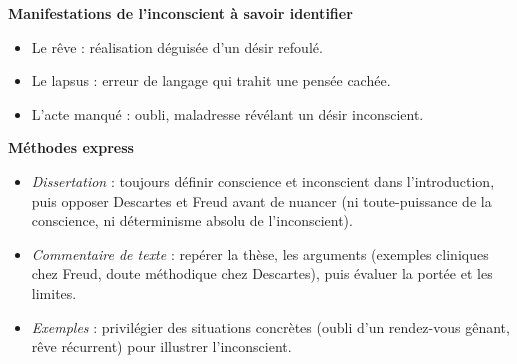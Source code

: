 \documentclass[11pt]{article}
\newcommand{\cle}[1]{{\popxbold\color{popdark}#1}}
\begin{document}
\begin{bilan}
\textbf{Manifestations de l'inconscient à savoir identifier}
\begin{itemize}
  \item Le \cle{rêve} : réalisation déguisée d'un désir refoulé.
  \item Le \cle{lapsus} : erreur de langage qui trahit une pensée cachée.
  \item L'\cle{acte manqué} : oubli, maladresse révélant un désir inconscient.
\end{itemize}

\textbf{Méthodes express}
\begin{itemize}
  \item \emph{Dissertation} : toujours définir conscience et inconscient dans l'introduction, puis opposer Descartes et Freud avant de nuancer (ni toute-puissance de la conscience, ni déterminisme absolu de l'inconscient).
  \item \emph{Commentaire de texte} : repérer la thèse, les arguments (exemples cliniques chez Freud, doute méthodique chez Descartes), puis évaluer la portée et les limites.
  \item \emph{Exemples} : privilégier des situations concrètes (oubli d'un rendez-vous gênant, rêve récurrent) pour illustrer l'inconscient.
\end{itemize}
\end{bilan}
\end{document}
